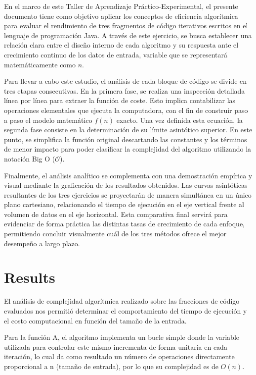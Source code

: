 \documentclass[pdflatex,sn-mathphys-num]{sn-jnl}%
\theoremstyle{thmstyleone}%
\theoremstyle{thmstyletwo}%
\theoremstyle{thmstylethree}%
\begin{document}
En el marco de este Taller de Aprendizaje Práctico-Experimental, el presente documento tiene como objetivo aplicar los conceptos de eficiencia algorítmica para evaluar el rendimiento de tres fragmentos de código iterativos escritos en el lenguaje de programación Java. A través de este ejercicio, se busca establecer una relación clara entre el diseño interno de cada algoritmo y su respuesta ante el crecimiento continuo de los datos de entrada, variable que se representará matemáticamente como $n$.

Para llevar a cabo este estudio, el análisis de cada bloque de código se divide en tres etapas consecutivas. En la primera fase, se realiza una inspección detallada línea por línea para extraer la función de coste. Esto implica contabilizar las operaciones elementales que ejecuta la computadora, con el fin de construir paso a paso el modelo matemático $f(n)$ exacto. Una vez definida esta ecuación, la segunda fase consiste en la determinación de su límite asintótico superior. En este punto, se simplifica la función original descartando las constantes y los términos de menor impacto para poder clasificar la complejidad del algoritmo utilizando la notación Big O ($\mathcal{O}$).

Finalmente, el análisis analítico se complementa con una demostración empírica y visual mediante la graficación de los resultados obtenidos. Las curvas asintóticas resultantes de los tres ejercicios se proyectarán de manera simultánea en un único plano cartesiano, relacionando el tiempo de ejecución en el eje vertical frente al volumen de datos en el eje horizontal. Esta comparativa final servirá para evidenciar de forma práctica las distintas tasas de crecimiento de cada enfoque, permitiendo concluir visualmente cuál de los tres métodos ofrece el mejor desempeño a largo plazo.


\section{Results}\label{sec2}

El análisis de complejidad algorítmica realizado sobre las fracciones de código evaluados nos permitió determinar el comportamiento del tiempo de ejecución y el costo computacional en función del tamaño de la entrada.

Para la función A, el algoritmo implementa un bucle simple donde la variable utilizada para controlar este mismo incrementa de forma unitaria en cada iteración, lo cual da como resultado un número de operaciones directamente proporcional a n (tamaño de entrada), por lo que su complejidad es de $O(n)$.
\end{document}
